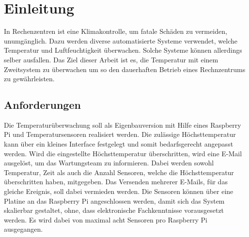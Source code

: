 \section{Einleitung}
In Rechenzentren ist eine Klimakontrolle, um fatale Schäden zu vermeiden, unumgänglich. Dazu werden diverse automatisierte Systeme verwendet, welche Temperatur und Luftfeuchtigkeit überwachen. Solche Systeme können allerdings selber ausfallen. Das Ziel dieser Arbeit ist es, die Temperatur mit einem Zweitsystem zu überwachen um so den dauerhaften Betrieb eines Rechnzentrums zu gewährleisten.\\
\subsection{Anforderungen}
Die Temperaturüberwachung soll als Eigenbauversion mit Hilfe eines Raspberry Pi und Temperatursensoren realisiert werden. Die zulässige Höchsttemperatur kann über ein kleines Interface festgelegt und somit bedarfsgerecht angepasst werden. Wird die eingestellte Höchsttemperatur überschritten, wird eine E-Mail ausgelöst, um das Wartungsteam zu informieren. Dabei werden sowohl Temperatur, Zeit als auch die Anzahl Sensoren, welche die Höchsttemperatur überschritten haben, mitgegeben. Das Versenden mehrerer E-Mails, für das gleiche Ereignis, soll dabei vermieden werden. Die Sensoren können über eine Platine an das Raspberry Pi angeschlossen werden, damit sich das System skalierbar gestaltet, ohne, dass elektronische Fachkenntnisse vorausgesetzt werden. Es wird dabei von maximal acht Sensoren pro Raspberry Pi ausgegangen.
\newpage